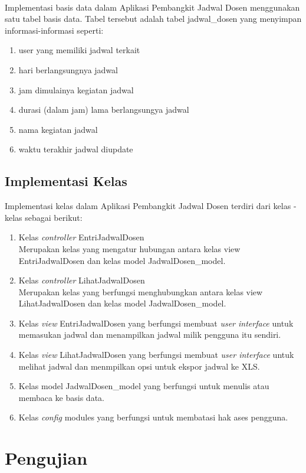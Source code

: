 \paragraph{}Implementasi basis data dalam Aplikasi Pembangkit Jadwal Dosen menggunakan satu tabel basis data. Tabel tersebut adalah tabel jadwal\_dosen yang menyimpan informasi-informasi seperti:
\begin{enumerate}
	\item user yang memiliki jadwal terkait
	\item hari berlangsungnya jadwal
	\item jam dimulainya kegiatan jadwal 
	\item durasi (dalam jam) lama berlangsungya jadwal
	\item nama kegiatan jadwal
	\item waktu terakhir jadwal diupdate
\end{enumerate}

\subsection{Implementasi Kelas}
Implementasi kelas dalam Aplikasi Pembangkit Jadwal Dosen terdiri dari kelas - kelas sebagai berikut:
\begin{enumerate}
	\item Kelas \textit{controller} EntriJadwalDosen\\
	Merupakan kelas yang mengatur hubungan antara kelas view EntriJadwalDosen dan kelas model JadwalDosen\_model.
	\item Kelas \textit{controller} LihatJadwalDosen\\
	Merupakan kelas yang berfungsi menghubungkan antara kelas view LihatJadwalDosen dan kelas model JadwalDosen\_model.
	\item Kelas \textit{view} EntriJadwalDosen yang berfungsi membuat \textit{user interface} untuk memasukan jadwal dan menampilkan jadwal milik pengguna itu sendiri.
	\item Kelas \textit{view} LihatJadwalDosen yang berfungsi membuat \textit{user interface} untuk melihat jadwal dan menmpilkan opsi untuk ekspor jadwal ke XLS.
	\item Kelas model JadwalDosen\_model yang berfungsi untuk menulis atau membaca ke basis data.
	\item Kelas \textit{config} modules yang berfungsi untuk membatasi hak ases pengguna.
\end{enumerate}

\section{Pengujian}
